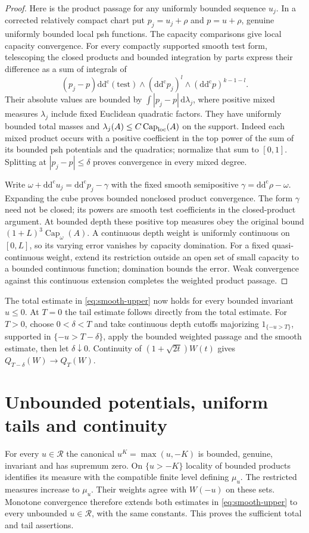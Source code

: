 \documentclass[11pt]{article}
\theoremstyle{remark}
\newcommand{\ddc}{\mathrm{d}\mathrm{d}^{\mathrm c}}
\begin{document}
\begin{proof}
Here is the product passage for any uniformly bounded sequence $u_j$.
In a corrected relatively compact chart put $p_j=u_j+\rho$ and
$p=u+\rho$, genuine uniformly bounded local psh functions. The capacity
comparisons give local capacity convergence. For every compactly supported
smooth test form, telescoping the closed products and bounded integration
by parts express their difference as a sum of integrals of
\[
 (p_j-p)\ddc(\text{test})\wedge
          (\ddc p_j)^l\wedge(\ddc p)^{k-1-l}.
\]
Their absolute values are bounded by $\int|p_j-p|\,\mathrm d\lambda_j$,
where positive mixed measures $\lambda_j$ include fixed Euclidean
quadratic factors. They have uniformly bounded total masses and
$\lambda_j(A)\leq C\operatorname{Cap}_{\rm loc}(A)$ on the support.
Indeed each mixed product occurs with a positive coefficient in the
top power of the sum of its bounded psh potentials and the quadratics;
normalize that sum to $[0,1]$. Splitting at $|p_j-p|\leq\delta$ proves
convergence in every mixed degree.

Write $\omega+\ddc u_j=\ddc p_j-\gamma$ with the fixed smooth
semipositive $\gamma=\ddc\rho-\omega$. Expanding the cube proves
bounded nonclosed product convergence. The form $\gamma$ need not be
closed; its powers are smooth test coefficients in the closed-product
argument. At bounded depth these positive top measures obey the original
bound $(1+L)^3\operatorname{Cap}_\omega(A)$.
A continuous depth weight is uniformly continuous on $[0,L]$, so its
varying error vanishes by capacity domination. For a fixed
quasi-continuous weight, extend its restriction outside an open set of
small capacity to a bounded continuous function; domination bounds the
error. Weak convergence against this continuous extension completes the
weighted product passage.
\end{proof}

The total estimate in \eqref{eq:smooth-upper} now holds for every bounded
invariant $u\leq0$. At $T=0$ the tail estimate follows directly from the total estimate.
For $T>0$, choose $0<\delta<T$ and take continuous depth cutoffs
majorizing $1_{\{-u>T\}}$, supported in $\{-u>T-\delta\}$, apply the
bounded weighted passage and the smooth estimate, then let
$\delta\downarrow0$. Continuity of $(1+\sqrt{2t})W(t)$ gives
$Q_{T-\delta}(W)\to Q_T(W)$.

\section{Unbounded potentials, uniform tails and continuity}
For every $u\in\mathcal R$ the canonical $u^K=\max(u,-K)$ is bounded,
genuine, invariant and has supremum zero. On $\{u>-K\}$ locality of
bounded products identifies its measure with the compatible finite
level defining $\mu_u$. The restricted measures increase to $\mu_u$.
Their weights agree with $W(-u)$ on these sets. Monotone convergence
therefore extends both estimates in \eqref{eq:smooth-upper} to every
unbounded $u\in\mathcal R$, with the same constants. This proves the
sufficient total and tail assertions.
\end{document}
